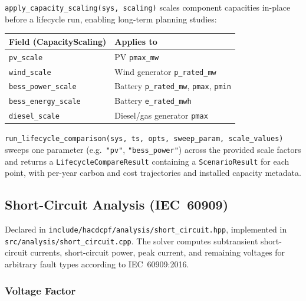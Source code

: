 \texttt{apply\_capacity\_scaling(sys, scaling)} scales component capacities
in-place before a lifecycle run, enabling long-term planning studies:

\begin{center}
\begin{tabular}{ll}
\hline\hline
\textbf{Field (CapacityScaling)} & \textbf{Applies to} \\
\hline
\texttt{pv\_scale} & PV \texttt{pmax\_mw} \\
\texttt{wind\_scale} & Wind generator \texttt{p\_rated\_mw} \\
\texttt{bess\_power\_scale} & Battery \texttt{p\_rated\_mw}, \texttt{pmax}, \texttt{pmin} \\
\texttt{bess\_energy\_scale} & Battery \texttt{e\_rated\_mwh} \\
\texttt{diesel\_scale} & Diesel/gas generator \texttt{pmax} \\
\hline\hline
\end{tabular}
\end{center}

\texttt{run\_lifecycle\_comparison(sys, ts, opts, sweep\_param, scale\_values)}
sweeps one parameter (e.g.\ \texttt{"pv"}, \texttt{"bess\_power"}) across
the provided scale factors and returns a \texttt{LifecycleCompareResult}
containing a \texttt{ScenarioResult} for each point, with per-year carbon
and cost trajectories and installed capacity metadata.

\subsection{Short-Circuit Analysis (IEC~60909)}
\label{sec:short-circuit-math}

Declared in \texttt{include/hacdcpf/analysis/short\_circuit.hpp},
implemented in \texttt{src/analysis/short\_circuit.cpp}.
The solver computes subtransient short-circuit currents, short-circuit
power, peak current, and remaining voltages for arbitrary fault types
according to IEC~60909:2016.

\subsubsection{Voltage Factor}

